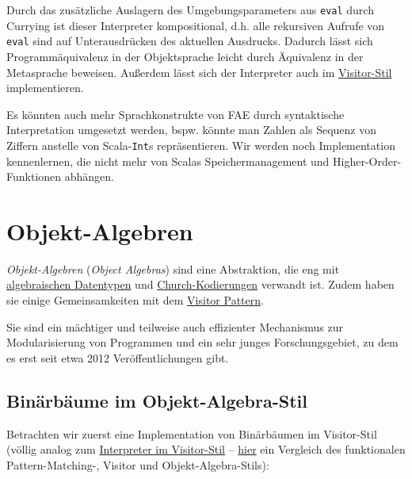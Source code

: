\documentclass[]{article}
\begin{document}
Durch das zusätzliche Auslagern des Umgebungsparameters aus
\texttt{eval} durch Currying ist dieser Interpreter kompositional, d.h.
alle rekursiven Aufrufe von \texttt{eval} sind auf Unterausdrücken des
aktuellen Ausdrucks. Dadurch lässt sich Programmäquivalenz in der
Objektsprache leicht durch Äquivalenz in der Metasprache beweisen.
Außerdem lässt sich der Interpreter auch im
\protect\hyperlink{abstraktion-durch-visitor}{Visitor-Stil}
implementieren.

Es könnten auch mehr Sprachkonstrukte von FAE durch syntaktische
Interpretation umgesetzt werden, bspw. könnte man Zahlen als Sequenz von
Ziffern anstelle von Scala-\texttt{Int}s repräsentieren. Wir werden noch
Implementation kennenlernen, die nicht mehr von Scalas
Speichermanagement und Higher-Order-Funktionen abhängen.

\hypertarget{objekt-algebren}{%
\section{Objekt-Algebren}}

\emph{Objekt-Algebren} (\emph{Object Algebras}) sind eine Abstraktion,
die eng mit
\href{https://en.wikipedia.org/wiki/Algebraic_data_type}{algebraischen
Datentypen} und
\protect\hyperlink{church-kodierungen}{Church-Kodierungen} verwandt ist.
Zudem haben sie einige Gemeinsamkeiten mit dem
\protect\hyperlink{abstraktion-durch-visitor}{Visitor Pattern}.

Sie sind ein mächtiger und teilweise auch effizienter Mechanismus zur
Modularisierung von Programmen und ein sehr junges Forschungsgebiet, zu
dem es erst seit etwa 2012 Veröffentlichungen gibt.

\hypertarget{binuxe4rbuxe4ume-im-objekt-algebra-stil}{%
\subsection{Binärbäume im
Objekt-Algebra-Stil}\label{binuxe4rbuxe4ume-im-objekt-algebra-stil}}

Betrachten wir zuerst eine Implementation von Binärbäumen im
Visitor-Stil (völlig analog zum
\protect\hyperlink{abstraktion-durch-visitor}{Interpreter im
Visitor-Stil} --
\href{https://github.com/DavidLaewen/programmiersprachen1/blob/main/additional-material/FunctionalVisitorObjectalgebra.scala}{hier}
ein Vergleich des funktionalen Pattern-Matching-, Visitor und
Objekt-Algebra-Stils):
\end{document}
